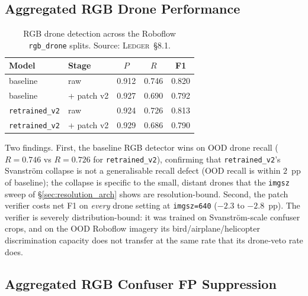 \documentclass[12pt,a4paper,oneside,openright]{book}
\begin{document}
\subsection{Aggregated RGB Drone Performance}

\begin{table}[htbp]
    \centering
    \caption{RGB drone detection across the Roboflow \texttt{rgb\_drone} splits. Source: \textsc{Ledger}~\S8.1.}
    \label{tab:ood_rgb_drone}
    \begin{tabular}{llccc}
        \toprule
        Model & Stage & $P$ & $R$ & F1 \\
        \midrule
        baseline      & raw           & 0.912 & 0.746 & 0.820 \\
        baseline      & + patch v2    & 0.927 & 0.690 & 0.792 \\
        \texttt{retrained\_v2}  & raw           & 0.924 & 0.726 & 0.813 \\
        \texttt{retrained\_v2}  & + patch v2    & 0.929 & 0.686 & 0.790 \\
        \bottomrule
    \end{tabular}
\end{table}

Two findings. First, the baseline RGB detector wins on OOD drone recall ($R=0.746$ vs $R=0.726$ for \texttt{retrained\_v2}), confirming that \texttt{retrained\_v2}'s Svanstr\"om collapse is not a generalisable recall defect (OOD recall is within $2$~pp of baseline); the collapse is specific to the small, distant drones that the \texttt{imgsz} sweep of \S\ref{sec:resolution_arch} shows are resolution-bound. Second, the patch verifier costs net F1 on \emph{every} drone setting at \texttt{imgsz=640} ($-2.3$ to $-2.8$~pp). The verifier is severely distribution-bound: it was trained on Svanstr\"om-scale confuser crops, and on the OOD Roboflow imagery its bird/airplane/helicopter discrimination capacity does not transfer at the same rate that its drone-veto rate does.

\subsection{Aggregated RGB Confuser FP Suppression}
\end{document}
